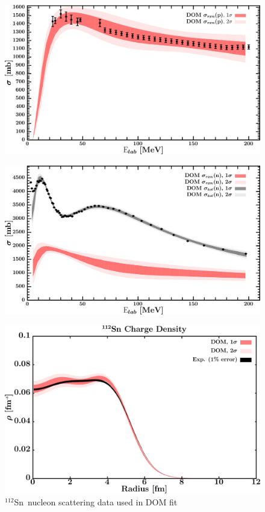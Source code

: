 \documentclass[twocolumn,secnumarabic,amssymb, nobibnotes, aps, prl,
superscriptaddress, nobalancelastpage]{revtex4}
\newcommand{\snTwelve}{\ensuremath{^{112}}S\lowercase{n}}
\begin{document}
\begin{figure}[!htb]
\begin{minipage}{0.4\linewidth}
        \centering
        \includegraphics[width=\linewidth]{figures/sn112_protonInelastic.png}
        \label{DOM_sn112_proton_inelastic}
    \end{minipage}\hspace{6pt}
    \begin{minipage}{0.4\linewidth}
        \centering
        \includegraphics[width=\linewidth]{figures/sn112_neutronInelastic.png}
        \label{DOM_sn112_neutron_inelastic}
    \end{minipage}
    \caption{\snTwelve\ nucleon scattering data used in DOM fit}
    \label{DOM_sn112_scattering}
    \centering
    \begin{minipage}{0.4\linewidth}
        \centering
        \includegraphics[width=\linewidth]{figures/sn112_chargeDensity.png}

\end{minipage}
\end{figure}
\end{document}
